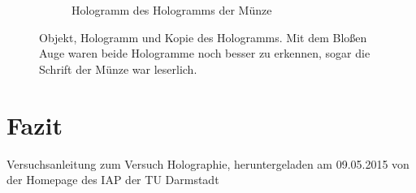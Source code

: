 \documentclass[bigchapter,colorback,accentcolor=tud4b,linedtoc,11pt]{tudreport}
\begin{document}
\begin{figure}[H]
\begin{subfigure}[h]{0.3\textwidth}
    \caption{Hologramm des Hologramms der Münze}
    \label{fig:gedenkholokopie}
  \end{subfigure}
  \caption{Objekt, Hologramm und Kopie des Hologramms. Mit dem Bloßen Auge waren
  beide Hologramme noch besser zu erkennen, sogar die Schrift der Münze war leserlich.}\label{fig:genkhologramme}
\end{figure}


\chapter{Fazit}

\cleardoublepage{}
\newpage
\begin{thebibliography}{100}
   Versuchsanleitung zum Versuch Holographie, heruntergeladen am 09.05.2015 von der Homepage des IAP der TU Darmstadt
\end{thebibliography}
\end{document}
